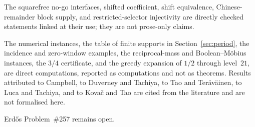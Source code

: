 \documentclass[11pt]{article}
\begin{document}
The squarefree
no-go interfaces, shifted coefficient, shift equivalence, Chinese-remainder
block supply, and restricted-selector injectivity are directly checked
statements linked at their use; they are not prose-only claims.

The numerical
instances, the
table of finite supports in Section~\ref{sec:period}, the incidence and
zero-window examples, the reciprocal-mass and Boolean--M\"obius instances, the
$3/4$ certificate, and the greedy expansion of $1/2$ through level~$21$,
are direct computations, reported as computations and not as theorems.
Results attributed to Campbell, to Duverney and Tachiya, to Tao and
Ter\"av\"ainen, to Luca and Tachiya, and to Kova\v{c} and Tao are cited from
the literature and are not formalised here.

Erd\H{o}s Problem~\#257 remains open.
\end{document}

